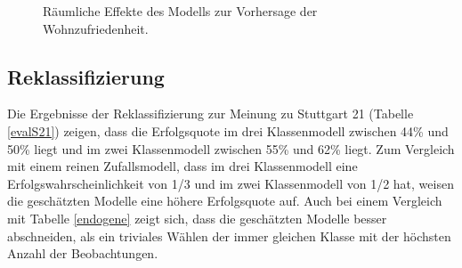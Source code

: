 \documentclass{Vorlage}
\begin{document}
\begin{figure}[htbp]
  \caption{Räumliche Effekte des Modells zur Vorhersage der Wohnzufriedenheit.}
  \label{rEffW}
\end{figure}

\subsection{Reklassifizierung}

Die Ergebnisse der Reklassifizierung zur Meinung zu Stuttgart 21 (Tabelle \ref{evalS21}) zeigen, dass die Erfolgsquote im drei Klassenmodell zwischen 44\% und 50\% liegt und im zwei Klassenmodell zwischen 55\% und 62\% liegt. Zum Vergleich mit einem reinen Zufallsmodell, dass im drei Klassenmodell eine Erfolgswahrscheinlichkeit von 1/3 und im zwei Klassenmodell von 1/2 hat, weisen die geschätzten Modelle eine höhere Erfolgsquote auf. Auch bei einem Vergleich mit Tabelle \ref{endogene} zeigt sich, dass die geschätzten Modelle besser abschneiden, als ein triviales Wählen der immer gleichen Klasse mit der höchsten Anzahl der Beobachtungen.
\end{document}
